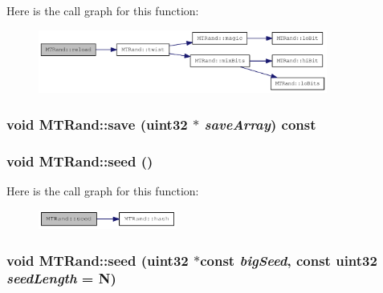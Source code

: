 Here is the call graph for this function:\nopagebreak
\begin{figure}[H]
\begin{center}
\leavevmode
\includegraphics[width=269pt]{classMTRand_a1d5fcb69d83f4d2fd653883c8352f86c_cgraph}
\end{center}
\end{figure}
\hypertarget{classMTRand_ad60e0f3f5c90baab75b74f9a2ccae871}{
\subsubsection[{save}]{\setlength{\rightskip}{0pt plus 5cm}void MTRand::save ({\bf uint32} $\ast$ {\em saveArray}) const}}
\label{classMTRand_ad60e0f3f5c90baab75b74f9a2ccae871}
\hypertarget{classMTRand_ad88ea3363d55bafb62826bbd130279c2}{
\subsubsection[{seed}]{\setlength{\rightskip}{0pt plus 5cm}void MTRand::seed ()}}
\label{classMTRand_ad88ea3363d55bafb62826bbd130279c2}


Here is the call graph for this function:\nopagebreak
\begin{figure}[H]
\begin{center}
\leavevmode
\includegraphics[width=129pt]{classMTRand_ad88ea3363d55bafb62826bbd130279c2_cgraph}
\end{center}
\end{figure}
\hypertarget{classMTRand_a5758103776b131e8ea46b6dc1b9fb267}{
\subsubsection[{seed}]{\setlength{\rightskip}{0pt plus 5cm}void MTRand::seed ({\bf uint32} $\ast$const  {\em bigSeed}, \/  const {\bf uint32} {\em seedLength} = {\ttfamily N})}}
\label{classMTRand_a5758103776b131e8ea46b6dc1b9fb267}


